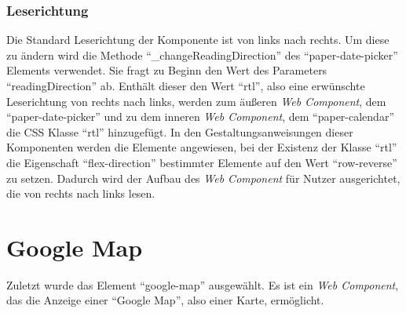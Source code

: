 \documentclass[12pt, paper=a4, bibtotoc, toc=listof, headsepline=true]{scrreprt}
\begin{document}
		\subsubsection{Leserichtung}
		Die Standard Leserichtung der Komponente ist von links nach rechts. Um diese zu ändern wird die Methode \enquote{\_changeReadingDirection} des \enquote{paper-date-picker} Elements verwendet. Sie fragt zu Beginn den Wert des Parameters \enquote{readingDirection} ab. Enthält dieser den Wert \enquote{rtl}, also eine erwünschte Leserichtung von rechts nach links, werden zum äußeren \emph{Web Component}, dem \enquote{paper-date-picker} und zu dem inneren \emph{Web Component}, dem \enquote{paper-calendar} die \ac{CSS} Klasse \enquote{rtl} hinzugefügt. In den Gestaltungsanweisungen dieser Komponenten werden die Elemente angewiesen, bei der Existenz der Klasse \enquote{rtl} die Eigenschaft \enquote{flex-direction} bestimmter Elemente auf den Wert \enquote{row-reverse} zu setzen. Dadurch wird der Aufbau des \emph{Web Component} für Nutzer ausgerichtet, die von rechts nach links lesen.
		\newpage
	
	\section{Google Map}
	Zuletzt wurde das Element \enquote{google-map} ausgewählt. Es ist ein \emph{Web Component}, das die Anzeige einer \enquote{Google Map}, also einer Karte, ermöglicht\cite{gooMap}.
\end{document}
